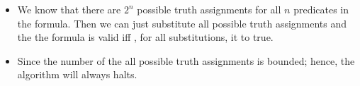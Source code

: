 \documentclass[11pt,twoside]{article}
\begin{document}
\begin{enumerate}
\begin{itemize}[label = {}]
\item We know that there are $2^n$ possible truth assignments for all $n$ predicates in the formula. Then we can just substitute all possible truth assignments and the the formula is valid iff , for all substitutions, it to true.
\item Since the number of the all possible truth assignments is bounded; hence, the algorithm will always halts.
\end{itemize}
\end{enumerate}
\end{document}
